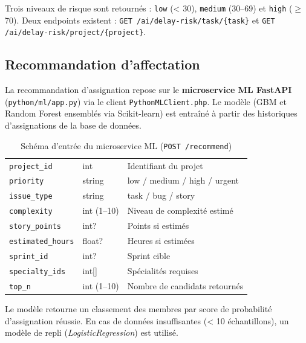 Trois niveaux de risque sont retournés : \texttt{low} (< 30), \texttt{medium}
(30--69) et \texttt{high} ($\geq$ 70). Deux endpoints existent :
\texttt{GET /ai/delay-risk/task/\{task\}} et
\texttt{GET /ai/delay-risk/project/\{project\}}.

\subsection{Recommandation d'affectation}

La recommandation d'assignation repose sur le \textbf{microservice ML FastAPI}
(\texttt{python/ml/app.py}) via le client \texttt{PythonMLClient.php}. Le modèle
(GBM et Random Forest ensemblés via Scikit-learn) est entraîné à partir des
historiques d'assignations de la base de données.

\begin{table}[H]
  \centering
  \caption{Schéma d'entrée du microservice ML (\texttt{POST /recommend})}
  \label{tab:ml_input}
  \begin{tabularx}{\textwidth}{L{3.5cm}L{2.5cm}X}
    \toprule
     &  &  \\
    \midrule
    \texttt{project\_id}      & int        & Identifiant du projet \\
    \texttt{priority}         & string     & low / medium / high / urgent \\
    \texttt{issue\_type}      & string     & task / bug / story \\
    \texttt{complexity}       & int (1–10) & Niveau de complexité estimé \\
    \texttt{story\_points}    & int?       & Points si estimés \\
    \texttt{estimated\_hours} & float?     & Heures si estimées \\
    \texttt{sprint\_id}       & int?       & Sprint cible \\
    \texttt{specialty\_ids}   & int[]      & Spécialités requises \\
    \texttt{top\_n}           & int (1–10) & Nombre de candidats retournés \\
    \bottomrule
  \end{tabularx}
\end{table}

Le modèle retourne un classement des membres par score de probabilité d'assignation
réussie. En cas de données insuffisantes (< 10 échantillons), un modèle de repli
(\textit{LogisticRegression}) est utilisé.

